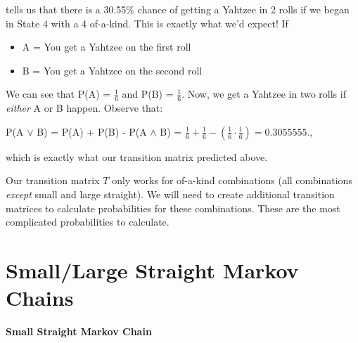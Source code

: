 \documentclass[12pt,a4paper]{article}
\begin{document}
\begin{flushleft}
tells us that there is a 30.55\% chance of getting a Yahtzee in 2 rolls if we began in State 4 with a 4 of-a-kind. This is exactly what we’d expect! If
\end{flushleft}

\begin{itemize}
    \item A = You get a Yahtzee on the first roll
    \item B = You get a Yahtzee on the second roll
\end{itemize}

\begin{flushleft}
We can see that P(A) = $\frac{1}{6}$ and P(B) = $\frac{1}{6}.$ Now, we get a Yahtzee in two rolls if \textit{either} A or B happen. Observe that:
\end{flushleft}

\begin{center}
P(A $\vee$ B) = P(A) + P(B) - P(A $\wedge$ B) = $\frac{1}{6} + \frac{1}{6} - (\frac{1}{6} \cdot \frac{1}{6}) = 0.3055555.$,
\end{center}

\begin{flushleft}
which is exactly what our transition matrix predicted above.

\vspace{5mm}

Our transition matrix $T$ only works for of-a-kind combinations (all combinations \textit{except} small and large straight). We will need to create additional transition matrices to calculate probabilities for these combinations. These are the most complicated probabilities to calculate.
\end{flushleft}

\section{Small/Large Straight Markov Chains}

\vspace{5mm}

\textbf{Small Straight Markov Chain}

\vspace{5mm}
\end{document}
